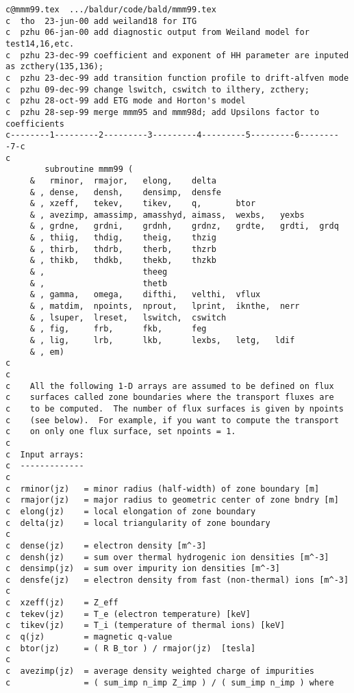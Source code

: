 \begin{verbatim}
c@mmm99.tex  .../baldur/code/bald/mmm99.tex
c  tho  23-jun-00 add weiland18 for ITG
c  pzhu 06-jan-00 add diagnostic output from Weiland model for test14,16,etc.
c  pzhu 23-dec-99 coefficient and exponent of HH parameter are inputed as zcthery(135,136);
c  pzhu 23-dec-99 add transition function profile to drift-alfven mode
c  pzhu 09-dec-99 change lswitch, cswitch to ilthery, zcthery; 
c  pzhu 28-oct-99 add ETG mode and Horton's model
c  pzhu 28-sep-99 merge mmm95 and mmm98d; add Upsilons factor to coefficients
c--------1---------2---------3---------4---------5---------6---------7-c
c
        subroutine mmm99 (
     &   rminor,  rmajor,   elong,    delta
     & , dense,   densh,    densimp,  densfe
     & , xzeff,   tekev,    tikev,    q,       btor
     & , avezimp, amassimp, amasshyd, aimass,  wexbs,   yexbs
     & , grdne,   grdni,    grdnh,    grdnz,   grdte,   grdti,  grdq
     & , thiig,   thdig,    theig,    thzig
     & , thirb,   thdrb,    therb,    thzrb
     & , thikb,   thdkb,    thekb,    thzkb
     & ,                    theeg
     & ,                    thetb
     & , gamma,   omega,    difthi,   velthi,  vflux
     & , matdim,  npoints,  nprout,   lprint,  iknthe,  nerr
     & , lsuper,  lreset,   lswitch,  cswitch
     & , fig,     frb,      fkb,      feg
     & , lig,     lrb,      lkb,      lexbs,   letg,   ldif
     & , em)
c
c
c    All the following 1-D arrays are assumed to be defined on flux
c    surfaces called zone boundaries where the transport fluxes are
c    to be computed.  The number of flux surfaces is given by npoints
c    (see below).  For example, if you want to compute the transport
c    on only one flux surface, set npoints = 1.
c
c  Input arrays:
c  -------------
c
c  rminor(jz)   = minor radius (half-width) of zone boundary [m]
c  rmajor(jz)   = major radius to geometric center of zone bndry [m]
c  elong(jz)    = local elongation of zone boundary
c  delta(jz)    = local triangularity of zone boundary
c
c  dense(jz)    = electron density [m^-3]
c  densh(jz)    = sum over thermal hydrogenic ion densities [m^-3]
c  densimp(jz)  = sum over impurity ion densities [m^-3]
c  densfe(jz)   = electron density from fast (non-thermal) ions [m^-3]
c
c  xzeff(jz)    = Z_eff
c  tekev(jz)    = T_e (electron temperature) [keV]
c  tikev(jz)    = T_i (temperature of thermal ions) [keV]
c  q(jz)        = magnetic q-value
c  btor(jz)     = ( R B_tor ) / rmajor(jz)  [tesla]
c
c  avezimp(jz)  = average density weighted charge of impurities
c               = ( sum_imp n_imp Z_imp ) / ( sum_imp n_imp ) where

\end{verbatim}
